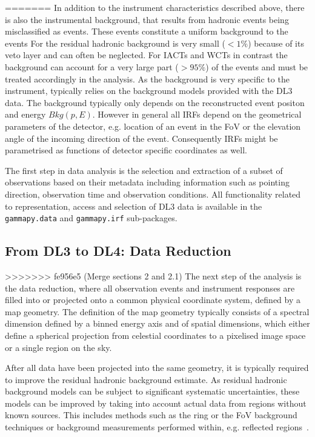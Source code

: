 \documentclass[longauth]{aa}
\newcommand{\code}[1]{\texttt{#1}}
\begin{document}
=======
In addition to the instrument characteristics described above, there is also the instrumental
background, that results from hadronic events being misclassified as \gammaray events. These
events constitute a uniform background to the \gammaray events For \fermi the residual hadronic background
is very small ($<1\%$) because of its veto layer and can often be neglected. For IACTs and WCTs in contrast
the background can account for a very large part ($>95\%$) of the events and must be treated
accordingly in the analysis. As the background is very specific to the instrument, \gammapy typically 
relies on the background models provided with the DL3 data. The background typically only depends
on the reconstructed event positon and energy $Bkg(p, E)$. However in general all IRFs depend on the
geometrical parameters of the detector, e.g. location of an event in the FoV or the elevation
angle of the incoming direction of the event. Consequently IRFs might be parametrised as functions
of detector specific coordinates as well.

The first step in \gammaray data analysis is the selection and extraction of a subset of
observations based on their metadata including information such as pointing direction,
observation time and observation conditions. All functionality related to representation, 
access and selection of DL3 data is available in the \code{gammapy.data} and \code{gammapy.irf}
sub-packages.


\subsection{From DL3 to DL4: Data Reduction}
>>>>>>> fe956e5 (Merge sections 2 and 2.1)
The next step of the analysis is the data reduction, where all observation events and instrument
responses are filled into or projected onto a common physical coordinate system, defined by
a map geometry. The definition of the map geometry typically consists of a spectral dimension
defined by a binned energy axis and of spatial dimensions, which either define 
a spherical projection from celestial coordinates to a pixelised image space
or a single region on the sky.

After all data have been projected into the same geometry, it is typically
required to improve the residual hadronic background estimate. As residual hadronic
background models can be subject to significant systematic uncertainties,
these models can be improved by taking into account actual data
from regions without known \gammaray sources. This includes methods 
such as the ring or the FoV background techniques or background measurements
performed within, e.g. reflected regions~\citep{Berge07}.
\end{document}
